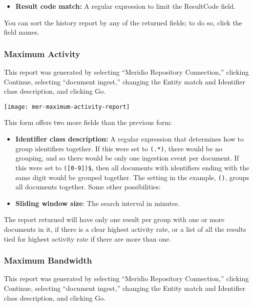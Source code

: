 \begin{changemargin}{1.5in}{0in}
\begin{itemize}
\item \textbf{Result code match:} A regular expression to limit the
ResultCode field.

\end{itemize}

You can sort the history report by any of the returned fields; to do so,
click the field names.

\subsubsection{Maximum Activity}

This report was generated by selecting ``Meridio Repository
Connection,'' clicking Continue, selecting ``document ingest,''
changing the Entity match and Identifier class description, and
clicking Go.

\texttt{[image: mer-maximum-activity-report]}

This form offers two more fields than the previous form:

\begin{itemize}

\item \textbf{Identifier class description:} A regular expression that
determines how to group identifiers together. If this were set to
\texttt{(.*)}, there would be no grouping, and so there would be only
one ingestion event per document. If this were set to
\texttt{([0-9])\$}, then all documents with identifiers ending with
the same digit would be grouped together. The setting in the example,
\texttt{()}, groups all documents together. Some other possibilities:

\item \textbf{Sliding window size}: The search interval in minutes.

\end{itemize}

The report returned will have only one result per group with one or more
documents in it, if there is a clear highest activity rate, or a list of
all the results tied for highest activity rate if there are more than one.

\subsubsection{Maximum Bandwidth}

This report was generated by selecting ``Meridio Repository
Connection,'' clicking Continue, selecting ``document ingest,''
changing the Entity match and Identifier class description, and
clicking Go.


\end{changemargin}

